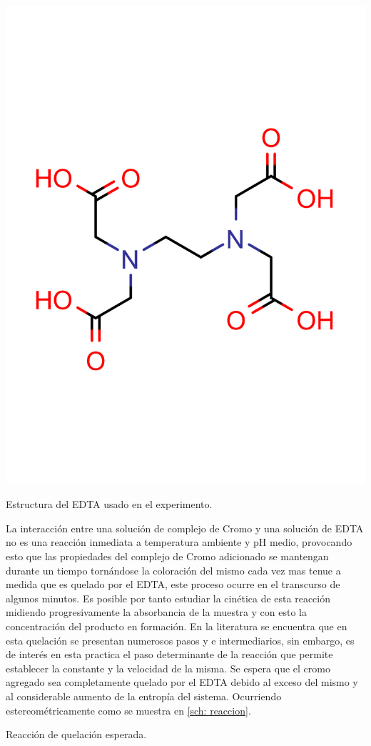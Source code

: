\documentclass[fleqn,10pt]{SelfArx} %
\begin{document}
	\begin{scheme}[h]
	    \centering
	    \includegraphics[scale=0.2]{images/EDTA.pdf}
	    \caption{Estructura del EDTA usado en el experimento.}
	    \label{sch: EDTA}
	\end{scheme}
	
	La interacción entre una solución de complejo de Cromo y una solución de EDTA no es una reacción inmediata a temperatura ambiente y pH medio, provocando esto que las propiedades del complejo de Cromo adicionado se mantengan durante un tiempo tornándose la coloración del mismo cada vez mas tenue a medida que es quelado por el EDTA, este proceso ocurre en el transcurso de algunos minutos. Es posible por tanto estudiar la cinética de esta reacción midiendo progresivamente la absorbancia de la muestra y con esto la concentración del producto en formación. En la literatura se encuentra que en esta quelación se presentan numerosos pasos y e intermediarios, sin embargo, es de interés en esta practica el paso determinante de la reacción que permite establecer la constante y la velocidad de la misma. Se espera que el cromo agregado sea completamente quelado por el EDTA debido al exceso del mismo y al considerable aumento de la entropía del sistema. Ocurriendo estereométricamente como se muestra en \autoref{sch: reaccion}.
	\begin{scheme}[h]
	    \centering
	   \caption{Reacci\'on de quelación esperada.}
	    \label{sch: reaccion}
	\end{scheme}
\end{document}
